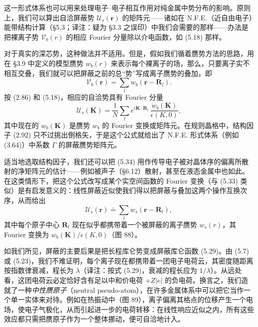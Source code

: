这一形式体系也可以用来处理电子--电子相互作用对纯金属中势分布的影响。原则上，我们可以算出自洽屏蔽势 $\mathcal{U}_{s}(\mathbf{r})$ 的矩阵元——诸如在 N.F.E.（近自由电子）能带结构计算（§5.3；译注：疑为 §3.3 之误印）中我们会需要的那样——办法是把裸离子势 $\mathcal{V}_{b}(r)$ 的相应 Fourier 分量除以介电函数，如 (5.18) 那样。

对于真实的深芯势，这种做法并不适用。但是，假如我们循着赝势方法的思路，用在 §3.9 中定义的模型赝势 $w_{b}(r)$ 来表示每个裸离子的场，那么，只要离子实不相互交叠，我们就可以把屏蔽之前的总“势”写成离子赝势的叠加，即
\begin{equation*}
\mathcal{V}_{b}(\mathbf{r})=\sum_{l}w_{b}(\mathbf{r}-\mathbf{R}_{l}).
\tag{5.33}
\end{equation*}
按 (2.86) 和 (5.18)，相应的自洽势具有 Fourier 分量
\begin{equation*}
\mathcal{U}_{s}(\mathbf{K})=\frac{1}{N}\sum_{l}e^{i\mathbf{K}\cdot\mathbf{R}_{l}}\,\frac{w_{b}(\mathbf{K})}{\epsilon(K,0)},
\tag{5.34}
\end{equation*}
其中现在的 $w_{b}(\mathbf{K})$ 是赝势 $w_{b}$ 的 Fourier 变换或矩阵元。在规则晶格中，结构因子 (2.92) 只不过挑出倒格矢，于是这个公式就给出了 N.F.E. 形式体系（例如 (3.64)）中系数 $\Gamma$ 的屏蔽赝势矩阵元。

适当地选取结构因子，我们还可以把 (5.34) 用作传导电子被对晶体序的偏离所散射的净矩阵元的估计——例如被声子（§6.12）散射，甚至在液态金属中也如此。在这类情形下，把这个公式改写成某个实空间函数的 Fourier 变换（与 (5.33) 类似）是有启发意义的：线性屏蔽近似使我们得以把屏蔽与叠加这两个操作互换次序，从而给出
\begin{equation*}
\mathcal{U}_{s}(\mathbf{r})\doteq\sum_{l}w_{s}(\mathbf{r}-\mathbf{R}_{l}),
\tag{5.35}
\end{equation*}
其中每个原子中心 $\mathbf{R}_{l}$ 现在似乎都携带着一个被屏蔽的离子赝势 $w_{s}(r)$，其 Fourier 变换为 $w_{b}(\mathbf{K})/\epsilon(K,0)$（图 88）。


如我们所见，屏蔽的主要后果是把长程库仑势变成屏蔽库仑函数 (5.29)。由 (5.7) 或 (5.23)，我们不难证明，每个离子现在都携带着一团电子电荷云，其密度随距离按指数律衰减，程长为 $\lambda$（译注：按式 (5.29)，衰减的程长应为 $1/\lambda$）。从远处看，这团电荷云必定恰好含有足以中和价电荷 $+Z|e|$ 的负电荷。换言之，我们造就了一种\emph{中性赝原子}（neutral pseudo-atom），在许多金属体系中可以把它当作一个单一实体来对待。例如在热振动中（图 89），离子偏离其格点的位移产生一个电场，使电子气极化，从而引起进一步的电荷转移：在线性响应近似之内，所有这些效应都只需把赝原子作为一个整体挪动，便可自洽地计入。

